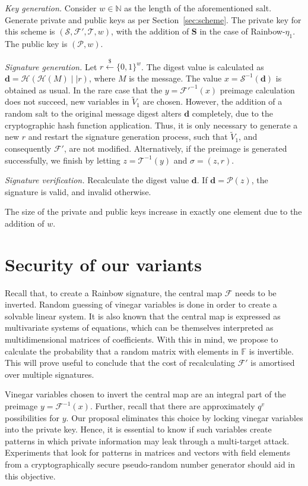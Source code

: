 \documentclass[openright]{report}
\newcommand{\random}{\stackrel{\$}{\longleftarrow}}
\begin{document}
\emph{Key generation.}
Consider $w \in \mathbb{N}$ as the length of the aforementioned salt. Generate
private and public keys as per Section~\ref{sec:scheme}. The private key
for this scheme is $(\mathcal{S}, \mathcal{F}', \mathcal{T}, w)$, with the
addition of $\mathbf{S}$ in the case of Rainbow-$\eta_{1}$. The public key is
$(\mathcal{P}, w)$.

\emph{Signature generation.}
Let $r \random{} {\{0, 1\}}^{w}$. The digest value is calculated as
$\mathbf{d} = \mathcal{H}(\mathcal{H}(M) \mid\mid r)$, where $M$ is the
message. The value $x = \mathcal{S}^{-1}(\mathbf{d})$ is obtained as usual. In
the rare case that the $y = \mathcal{F}'^{-1}(x)$ preimage calculation does not
succeed, new variables in $\widetilde{V}_{1}$ are chosen. However, the
addition of a random salt to the original message digest alters $\mathbf{d}$
completely, due to the cryptographic hash function application. Thus, it is
only necessary to generate a new $r$ and restart the signature generation
process, such that $\widetilde{V}_{1}$, and consequently $\mathcal{F}'$, are
not modified. Alternatively, if the preimage is generated successfully, we
finish by letting $z = \mathcal{T}^{-1}(y)$ and $\sigma = (z, r)$.

\emph{Signature verification.}
Recalculate the digest value $\mathbf{d}$. If $\mathbf{d} = \mathcal{P}(z)$,
the signature is valid, and invalid otherwise.

The size of the private and public keys increase in exactly one element due to
the addition of $w$.

\section{Security of our variants}\label{sec:security}

Recall that, to create a Rainbow signature, the central map $\mathcal{F}$ needs
to be inverted. Random guessing of vinegar variables is done in order to create
a solvable linear system. It is also known that the central map is expressed as
multivariate systems of equations, which can be themselves interpreted as
multidimensional matrices of coefficients. 
With this in mind, we propose to calculate the probability that a
random matrix with elements in $\mathbb{F}$ is invertible. This will prove useful
to conclude that the cost of recalculating $\mathcal{F}'$ is amortised over
multiple signatures.

Vinegar variables chosen to invert the central map are an integral part of the
preimage $y = \mathcal{F}^{-1}(x)$. 
Further, recall that there are approximately $q^v$ possibilities for $y$. Our
proposal eliminates this choice by locking vinegar variables into the private
key. Hence, it is essential to know if such variables create patterns in which
private information may leak through a multi-target attack. Experiments that
look for patterns in matrices and vectors with field elements from a
cryptographically secure pseudo-random number generator should aid in this objective.
\end{document}
